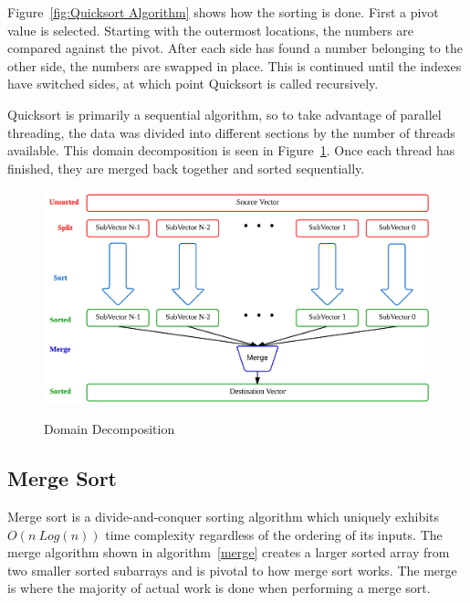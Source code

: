 \documentclass[journal]{IEEEtran}
\begin{document}
Figure~\ref{fig:Quicksort Algorithm} shows how the sorting is done. First a pivot value is selected.  Starting with the outermost locations, the numbers are compared against the pivot.  After each side has found a number belonging to the other side, the numbers are swapped in place. This is continued until the indexes have switched sides, at which point Quicksort is called recursively.

Quicksort is primarily a sequential algorithm, so to take advantage of parallel threading, the data was divided into different sections by the number of threads available.  This domain decomposition is seen in Figure~\ref{fig:dd}.  Once each thread has finished, they are merged back together and sorted sequentially. 

\begin{figure}[t]
  \caption{Domain Decomposition}
  \centering
  \includegraphics[width=.75\textwidth]{include/dd.png}
  \label{fig:dd}
\end{figure}


%		
%			
%			


%
%    
%


\subsection{Merge Sort}
Merge sort is a divide-and-conquer sorting algorithm which uniquely exhibits $O(n\ Log(n))$ time complexity regardless of the ordering of its inputs.  The merge algorithm shown in algorithm~\ref{merge} creates a larger sorted array from two smaller sorted subarrays and is pivotal to how merge sort works.  The merge is where the majority of actual work is done when performing a merge sort.   
\end{document}
